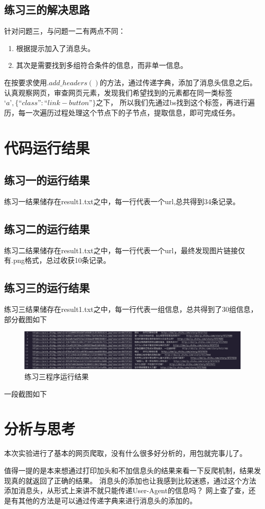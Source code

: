 \documentclass[UTF8]{ctexart}
\begin{document}
        \subsection{练习三的解决思路}
            针对问题三，与问题一二有两点不同：
            \begin{enumerate}
                \item 根据提示加入了消息头。
                \item 其次是需要找到多组符合条件的信息，而非单一信息。
            \end{enumerate}

            在按要求使用$.add\_headers()$的方法，通过传递字典，添加了消息头信息之后。
            认真观察网页，审查网页元素，发现我们希望找到的元素都在同一类标签$‘a’,\{“class”:“link-button”\}$之下，
            所以我们先通过bs找到这个标签，再进行遍历，每一次遍历过程处理这个节点下的子节点，提取信息，即可完成任务。
    \section{代码运行结果}
        \subsection{练习一的运行结果}
        练习一结果储存在result1.txt之中，每一行代表一个url,总共得到34条记录。
        \subsection{练习二的运行结果}
        练习二结果储存在result1.txt之中，每一行代表一个url，最终发现图片链接仅有.png格式，总过收获10条记录。
        \subsection{练习三的运行结果}
        练习三结果储存在result1.txt之中，每一行代表一组信息，总共得到了30组信息，部分截图如下
            \begin{figure}[ht]
                \centering
                \includegraphics[scale=0.25]{img/result3_img.png}
                \caption{练习三程序运行结果}
            \end{figure}
        一段截图如下
    \section{分析与思考}
        本次实验进行了基本的网页爬取，没有什么很多好分析的，用包就完事儿了。

        值得一提的是本来想通过打印加头和不加信息头的结果来看一下反爬机制，结果发现真的就返回了正确的结果。
        消息头的添加也让我感到比较迷惑，通过这个方法添加消息头，从形式上来讲不就只能传递User-Agent的信息吗？
        网上查了查，还是有其他的方法是可以通过传递字典来进行消息头的添加的。
\end{document}
